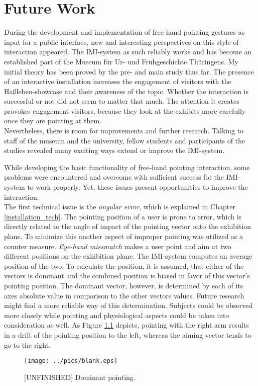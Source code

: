 \chapter{Future Work}
\label{future_work}

During the development and implementation of free-hand pointing gestures as input for a public interface, new and interesting perspectives on this style of interaction appeared. The \ac{IMI}-system as such reliably works and has become an established part of the Museum für Ur- und Frühgeschichte Thüringens. My initial theory has been proved by the pre- and main study thus far. The presence of an interactive installation increases the engagement of visitors with the Haßleben-showcase and their awareness of the topic. Whether the interaction is successful or not did not seem to matter that much. The attention it creates provokes engagement visitors, because they look at the exhibits more carefully once they are pointing at them. 
\\
Nevertheless, there is room for improvements and further research. Talking to staff of the museum and the university, fellow students and participants of the studies revealed many exciting ways extend or improve the \ac{IMI}-system. 

While developing the basic functionality of free-hand pointing interaction, some problems were encountered and overcome with sufficient success for the \ac{IMI}-system to work properly. Yet, these issues present opportunities to improve the interaction.
\\
The first technical issue is the \textit{angular error}, which is explained in Chapter \ref{installation_tech}. The pointing position of a user is prone to error, which is directly related to the angle of impact of the pointing vector onto the exhibition plane. To minimize this another aspect of improper pointing was utilized as a counter measure. \textit{Eye-hand missmatch} makes a user point and aim at two different positions on the exhibition plane. The \ac{IMI}-system computes an average position of the two. To calculate the position, it is assumed, that either of the vectors is dominant and the combined position is biased in favor of this vector's pointing position. The dominant vector, however, is determined by each of its axes absolute value in comparison to the other vectors values. Future research might find a more reliable way of this determination. Subjects could be observed more closely while pointing and physiological aspects could be taken into consideration as well. As Figure \ref{fig:dominant_pointing} depicts, pointing with the right arm results in a drift of the pointing position to the left, whereas the aiming vector tends to go to the right.
\begin{figure}[H]%
\texttt{[image: ../pics/blank.eps]}%
\caption{[UNFINISHED] Dominant pointing.}%
\label{fig:dominant_pointing} %
\end{figure}

